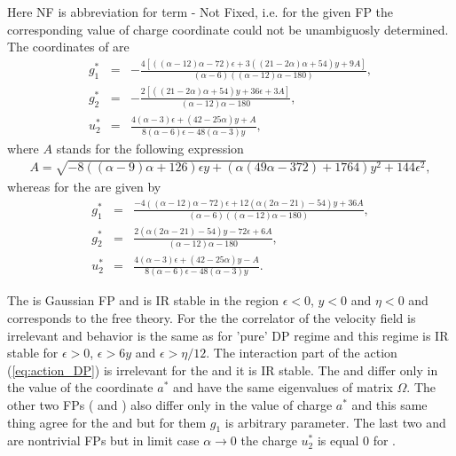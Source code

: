 Here NF is abbreviation for term - Not Fixed, i.e. for the given FP the corresponding value
of charge coordinate could not be unambiguosly determined.
The coordinates of  are
\begin{eqnarray*}
g_1^{*} &=& -\frac{4 \left[((\alpha -12) \alpha -72) \epsilon +3 ((21-2 \alpha ) \alpha +54) y +9 A\right]}{(\alpha-6) ((\alpha -12) \alpha -180)}, \\
g_2^{*} &=& -\frac{2 \left[ ((21-2 \alpha ) \alpha +54) y+36 \epsilon + 3 A \right]}{(\alpha -12) \alpha-180}, \\
u_2^{*} &=& \frac{4 (\alpha -3) \epsilon +(42-25 \alpha ) y+A}{8 (\alpha -6) \epsilon -48 (\alpha -3) y},
\end{eqnarray*}
where $A$ stands for the following expression 
\begin{eqnarray}
A =\sqrt{-8 ((\alpha -9) \alpha +126) \epsilon  y+(\alpha  (49 \alpha -372)+1764) y^2+144 \epsilon ^2},
\label{eq_notationA}
\end{eqnarray}
whereas for the  are given by 
\begin{eqnarray*}
g_1^{*} &=& \frac{-4 ((\alpha -12) \alpha -72) \epsilon +12 (\alpha (2 \alpha -21)-54) y + 36 A}{(\alpha -6) ((\alpha -12) \alpha -180)}, \\
g_2^{*} &=& \frac{2 (\alpha  (2 \alpha -21)-54) y-72 \epsilon +6 A}{(\alpha -12) \alpha -180},\\
u_2^{*} &=& \frac{4 (\alpha -3) \epsilon +(42-25 \alpha ) y - A}{8 (\alpha -6) \epsilon -48 (\alpha -3) y}.
\end{eqnarray*}

The  is Gaussian FP and is IR stable in the region
 $\epsilon<0$, $y<0$ and $\eta<0$ and corresponds to the free theory.
  For the  the correlator of the velocity field is irrelevant and behavior
   is the same as for 'pure' DP regime and this regime is IR stable for $\epsilon>0$, $\epsilon>6y$
    and $\epsilon>\eta/12$. The interaction part of the action (\ref{eq:action_DP}) is
     irrelevant for the  and it is IR stable. The  and  differ
      only in the value of the coordinate $a^*$ and have the same eigenvalues of matrix $\Omega$.
       The other two FPs ( and ) also differ only in the value of 
       charge $a^{*}$ and this same thing agree for the  and  but
        for them $g_1$ is arbitrary parameter. The last two  and 
         are nontrivial FPs but in limit case $\alpha \rightarrow 0$ the charge $u_2^{*}$ is equal $0$ for .   



